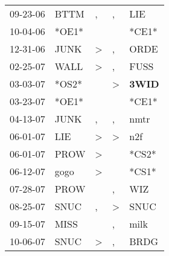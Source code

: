 \begin{supertabular}{p{0.07\textwidth}p{0.06\textwidth}p{0.02\textwidth}p{0.02\textwidth}p{0.06\textwidth}}
          09-23-06\textsuperscript{} &           BTTM\textsuperscript{} &                , &                , &            LIE\textsuperscript{} \\
          10-04-06\textsuperscript{} &                            *OE1* &                  &                  &                            *CE1* \\
          12-31-06\textsuperscript{} &           JUNK\textsuperscript{} &     \textgreater &                , &           ORDE\textsuperscript{} \\
          02-25-07\textsuperscript{} &           WALL\textsuperscript{} &     \textgreater &                , &           FUSS\textsuperscript{} \\
          03-03-07\textsuperscript{} &                            *OS2* &                  &     \textgreater &  \textbf{3WID\textsuperscript{}} \\
          03-23-07\textsuperscript{} &                            *OE1* &                  &                  &                            *CE1* \\
          04-13-07\textsuperscript{} &           JUNK\textsuperscript{} &                , &                , &           nmtr\textsuperscript{} \\
          06-01-07\textsuperscript{} &            LIE\textsuperscript{} &     \textgreater &     \textgreater &            n2f\textsuperscript{} \\
          06-01-07\textsuperscript{} &           PROW\textsuperscript{} &     \textgreater &                  &                            *CS2* \\
          06-12-07\textsuperscript{} &           gogo\textsuperscript{} &     \textgreater &                  &                            *CS1* \\
          07-28-07\textsuperscript{} &           PROW\textsuperscript{} &                  &                , &            WIZ\textsuperscript{} \\
          08-25-07\textsuperscript{} &           SNUC\textsuperscript{} &                , &     \textgreater &           SNUC\textsuperscript{} \\
          09-15-07\textsuperscript{} &           MISS\textsuperscript{} &                  &                , &           milk\textsuperscript{} \\
          10-06-07\textsuperscript{} &           SNUC\textsuperscript{} &     \textgreater &                , &           BRDG\textsuperscript{} \\

\end{supertabular}
